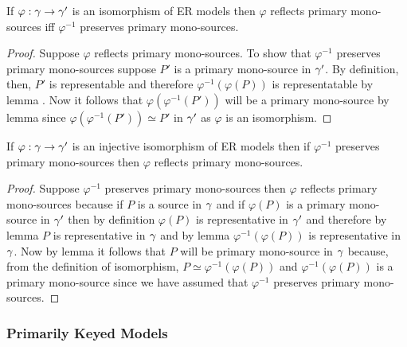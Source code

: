 \begin{lemma}
If $\varphi: \gamma \rightarrow \gamma'$ is an isomorphism of ER models  then
$\varphi$ reflects primary mono-sources iff $\varphi^{-1}$ preserves primary mono-sources.
\end{lemma}
\begin{proof}
Suppose $\varphi$ reflects primary mono-sources. To show that $\varphi^{-1}$ preserves primary mono-sources suppose
 $P'$ is a primary mono-source in $\gamma'$. By definition, then,  $P'$ is representable  and therefore $\varphi^{-1}(\varphi(P))$ is representatable 
by lemma .  Now it follows that  $\varphi(\varphi^{-1}(P'))$ will be a primary mono-source by lemma  since $\varphi(\varphi^{-1}(P')) \simeq P'$ in $\gamma'$ as $\varphi$ is an isomorphism. 
\end{proof}

\begin{lemma}
If $\varphi: \gamma \rightarrow \gamma'$ is an injective isomorphism of ER models  then
if $\varphi^{-1}$ preserves primary mono-sources
then $\varphi$ reflects primary mono-sources.
\end{lemma}
\begin{proof}
Suppose $\varphi^{-1}$ preserves primary mono-sources then $\varphi$ reflects primary mono-sources because
if $P$ is a source in $\gamma$ and if $\varphi(P)$ is a primary mono-source in $\gamma'$ then
by definition $\varphi(P)$ is representative in $\gamma'$ and therefore by lemma  
$P$ is representative in $\gamma$ and by lemma  $\varphi^{-1}(\varphi(P))$ is representative in $\gamma$.
Now by lemma  it follows that $P$ will be primary mono-source in $\gamma$ because, from the definition of
isomorphism,  $P \simeq \varphi^{-1}(\varphi(P))$ and $\varphi^{-1}(\varphi(P))$ is a primary mono-source since we have assumed
that  $\varphi^{-1}$ preserves primary mono-sources. 
\end{proof}


\subsubsection{Primarily Keyed Models}


